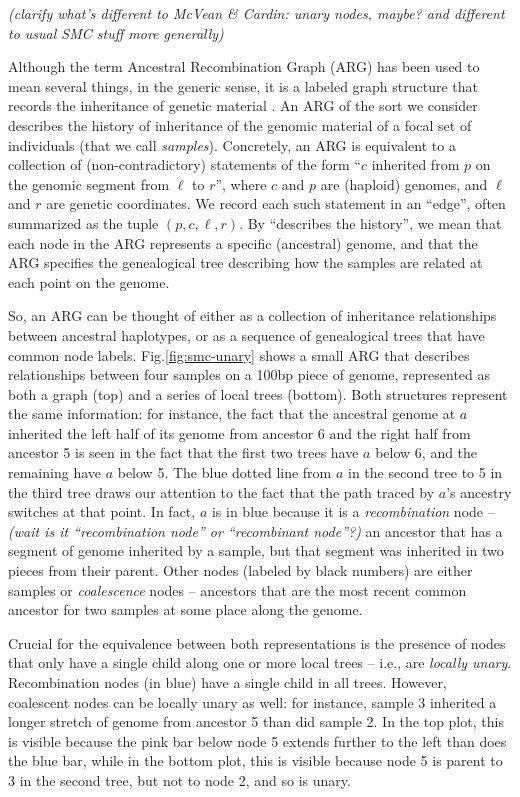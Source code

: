\documentclass{article}
\newcommand{\comment}[1]{{\it \color{orange} (#1)}}
\begin{document}
\comment{clarify what's different to McVean \& Cardin: unary nodes, maybe? and different to usual SMC stuff more generally}

Although the term Ancestral Recombination Graph (ARG) has been used to mean several things,
in the generic sense, it is a labeled graph structure that records
the inheritance of genetic material \citep{wong_general_2023}.
An ARG of the sort we consider describes the history of inheritance
of the genomic material of a focal set of individuals (that we call \emph{samples}).
Concretely, an ARG is equivalent to a collection of (non-contradictory) statements
of the form ``$c$ inherited from $p$ on the genomic segment from $\ell$ to $r$'',
where $c$ and $p$ are (haploid) genomes, and $\ell$ and $r$ are genetic coordinates.
We record each such statement in an ``edge'',
often summarized as the tuple $(p,c,\ell,r)$.
By ``describes the history'',
we mean that each node in the ARG represents a specific (ancestral) genome,
and that the ARG specifies the genealogical tree describing how the samples are related
at each point on the genome.

So, an ARG can be thought of either as a collection of inheritance relationships
between ancestral haplotypes,
or as a sequence of genealogical trees that have common node labels.
Fig.\ref{fig:smc-unary} shows a small ARG
that describes relationships between four samples on a 100bp piece of genome,
represented as both a graph (top) and a series of local trees (bottom).
Both structures represent the same information:
for instance, the fact that the ancestral genome at $a$
inherited the left half of its genome from ancestor 6
and the right half from ancestor 5
is seen in the fact that the first two trees have $a$ below 6,
and the remaining have $a$ below 5.
The blue dotted line from $a$ in the second tree to 5 in the third tree
draws our attention to the fact that
the path traced by $a$'s ancestry switches at that point.
In fact, $a$ is in blue because it is a \emph{recombination} node --
\comment{wait is it ``recombination node'' or ``recombinant node''?}
an ancestor that has a segment of genome inherited by a sample,
but that segment was inherited in two pieces from their parent.
Other nodes (labeled by black numbers) are either samples
or \emph{coalescence} nodes --
ancestors that are the most recent common ancestor for two samples
at some place along the genome.

Crucial for the equivalence between both representations is the presence of
nodes that only have a single child along one or more local trees --
i.e., are \emph{locally unary}.
Recombination nodes (in blue) have a single child in all trees.
However, coalescent nodes can be locally unary as well:
for instance, sample 3 inherited a longer stretch of genome from ancestor 5
than did sample 2.
In the top plot, this is visible because the pink bar below node 5
extends further to the left than does the blue bar,
while in the bottom plot, this is visible because node 5 is parent to 3
in the second tree, but not to node 2, and so is unary.
\end{document}
